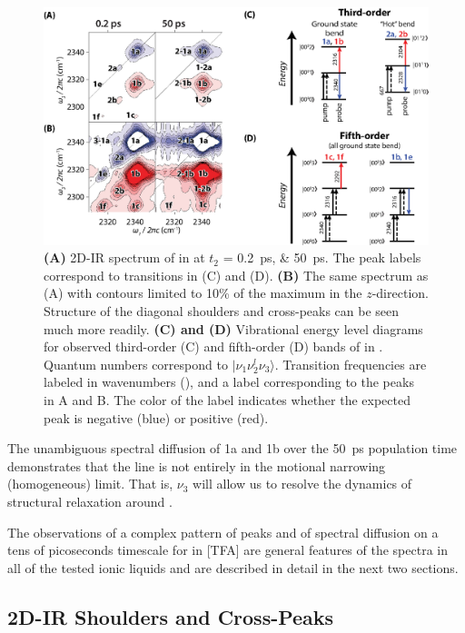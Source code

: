 {\begin{figure}
  \centering
  \includegraphics[scale=1]{./paper_01/fig5_update4.eps}
  \caption[2D-IR spectra of carbon dioxide in ionic liquids]{\label{fig:example 2D}\textbf{(A)} 2D-IR spectrum of  in \ce{[Im_{4,1}][TFA]} at \(t_2\) = \SIlist[list-units = single]{0.2;50}{\ps}. The peak labels correspond to transitions in (C) and (D). \textbf{(B)} The same spectrum as (A) with contours limited to 10\% of the maximum in the $z$-direction. Structure of the diagonal shoulders and cross-peaks can be seen much more readily. \textbf{(C) and (D)} Vibrational energy level diagrams for observed third-order (C) and fifth-order (D) bands of  in \ce{[Im_{4,1}][TFA]}. Quantum numbers correspond to $|\nu_1 \nu_2^l \nu_3\rangle$. Transition frequencies are labeled in wavenumbers (\si{\wavenumber}), and a label corresponding to the peaks in A and B. The color of the label indicates whether the expected peak is negative (blue) or positive (red).}
\end{figure}

The unambiguous spectral diffusion of 1a and 1b over the \SI{50}{\ps} population time demonstrates that the line is not entirely in the motional narrowing (homogeneous) limit. That is, \(\nu_3\) will allow us to resolve the dynamics of structural relaxation around .

The observations of a complex pattern of peaks and of spectral diffusion on a tens of picoseconds timescale for  in \ce{[Im_{4,1}]}[TFA]  are general features of the spectra in all of the tested ionic liquids and are described in detail in the next two sections.

\subsection{2D-IR Shoulders and Cross-Peaks}
\label{sec:shoulders}

}

